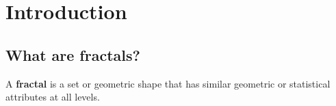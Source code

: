\chapter*{Introduction}
\section{What are fractals?}
\begin{dfn}
  A {\bf fractal} is a set or geometric shape that has similar
  geometric or statistical attributes at all levels.
\end{dfn}
